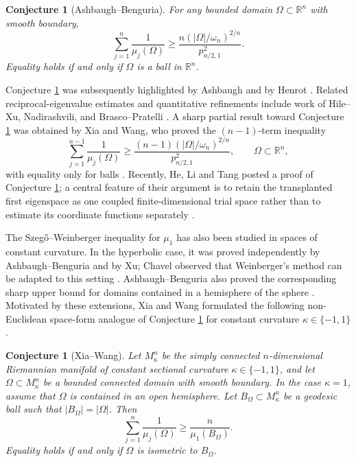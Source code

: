 \documentclass[11pt]{amsart}
\newtheorem{conjecture}[theorem]{Conjecture}
\theoremstyle{remark}
\newcommand{\RR}{\mathbb R}
\begin{document}
\begin{conjecture}[Ashbaugh--Benguria]\label{conj:AB-euclidean}
For any bounded domain $\Omega\subset\RR^n$ with smooth boundary,
\begin{equation*}
        \sum_{j=1}^n\frac1{\mu_j(\Omega)}
        \ge
        \frac{n(|\Omega|/\omega_n)^{2/n}}{p_{n/2,1}^2}.
\end{equation*}
Equality holds if and only if $\Omega$ is a ball in $\RR^n$.
\end{conjecture}

Conjecture \ref{conj:AB-euclidean} was subsequently highlighted by Ashbaugh and by Henrot \cite{AshbaughOpen,Henrot}.  Related reciprocal-eigenvalue estimates and quantitative refinements include work of Hile--Xu, Nadirashvili, and Brasco--Pratelli \cite{HileXu,Nadirashvili,BrascoPratelli}.  A sharp partial result toward Conjecture \ref{conj:AB-euclidean} was obtained by Xia and Wang, who proved the $(n-1)$-term inequality
$$
        \sum_{j=1}^{n-1}\frac1{\mu_j(\Omega)}
        \ge
        \frac{(n-1)(|\Omega|/\omega_n)^{2/n}}{p_{n/2,1}^2},
        \qquad \Omega\subset\RR^n,
$$
with equality only for balls \cite{XiaWang}.  Recently, He, Li and Tang posted a proof of Conjecture \ref{conj:AB-euclidean}; a central feature of their argument is to retain the transplanted first eigenspace as one coupled finite-dimensional trial space rather than to estimate its coordinate functions separately \cite{HeLiTang}.

The Szeg\H{o}--Weinberger inequality for $\mu_1$ has also been studied in spaces of constant curvature.  In the hyperbolic case, it was proved independently by Ashbaugh--Benguria and by Xu; Chavel observed that Weinberger's method can be adapted to this setting \cite{AB1995,Xu,Chavel}.  Ashbaugh--Benguria also proved the corresponding sharp upper bound for domains contained in a hemisphere of the sphere \cite{AB1995}.  Motivated by these extensions, Xia and Wang formulated the following  non-Euclidean space-form analogue of Conjecture \ref{conj:AB-euclidean} for constant curvature $\kappa\in\{-1,1\}$ \cite{XiaWang}.

\begin{conjecture}[Xia--Wang]\label{conj:XW-spaceform}
Let $M^n_\kappa$ be the simply connected $n$-dimensional Riemannian manifold of constant sectional curvature $\kappa\in\{-1,1\}$, and let $\Omega\subset M^n_\kappa$ be a bounded connected domain with smooth boundary.  In the case $\kappa=1$, assume that $\Omega$ is contained in an open hemisphere.  Let $B_\Omega\subset M^n_\kappa$ be a geodesic ball such that $|B_\Omega|=|\Omega|$.  Then
\begin{equation}\label{eq:XW-spaceform-conj}
        \sum_{j=1}^n\frac1{\mu_j(\Omega)}
        \ge
        \frac{n}{\mu_1(B_\Omega)}.
\end{equation}
Equality holds if and only if $\Omega$ is isometric to $B_\Omega$.
\end{conjecture}
\end{document}
